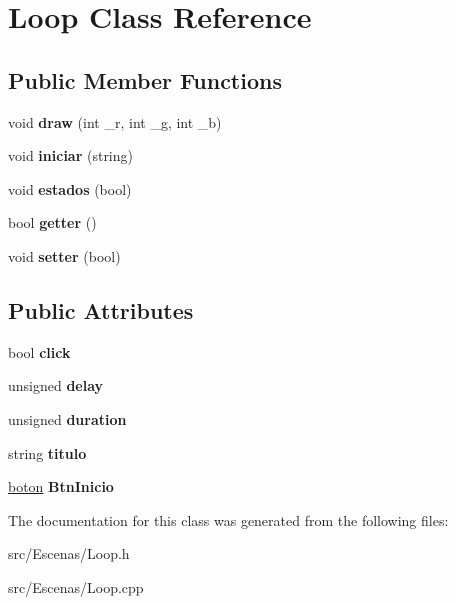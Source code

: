 \hypertarget{class_loop}{}\section{Loop Class Reference}
\label{class_loop}
\subsection*{Public Member Functions}
\begin{DoxyCompactItemize}
\item 
\hypertarget{class_loop_af5a09e01ccb89c4a56ff413307e40f35}{}void {\bfseries draw} (int \+\_\+r, int \+\_\+g, int \+\_\+b)\label{class_loop_af5a09e01ccb89c4a56ff413307e40f35}

\item 
\hypertarget{class_loop_a9306a04aa633128dbb189447f98e7bb6}{}void {\bfseries iniciar} (string)\label{class_loop_a9306a04aa633128dbb189447f98e7bb6}

\item 
\hypertarget{class_loop_a0ff1b1f2b8ecaaacf12f50ca99c78e71}{}void {\bfseries estados} (bool)\label{class_loop_a0ff1b1f2b8ecaaacf12f50ca99c78e71}

\item 
\hypertarget{class_loop_a383a56657f0f66f38574b861acc1e08c}{}bool {\bfseries getter} ()\label{class_loop_a383a56657f0f66f38574b861acc1e08c}

\item 
\hypertarget{class_loop_a743df2606ee2bffbdb023cdf3990811b}{}void {\bfseries setter} (bool)\label{class_loop_a743df2606ee2bffbdb023cdf3990811b}

\end{DoxyCompactItemize}
\subsection*{Public Attributes}
\begin{DoxyCompactItemize}
\item 
\hypertarget{class_loop_a379dc8a5cdafdacd57827551e71d70b3}{}bool {\bfseries click}\label{class_loop_a379dc8a5cdafdacd57827551e71d70b3}

\item 
\hypertarget{class_loop_acd394210e9a806bd24b6b6b9fc9348c0}{}unsigned {\bfseries delay}\label{class_loop_acd394210e9a806bd24b6b6b9fc9348c0}

\item 
\hypertarget{class_loop_ad6e5bad3f0c7b5e82a09703fe2745618}{}unsigned {\bfseries duration}\label{class_loop_ad6e5bad3f0c7b5e82a09703fe2745618}

\item 
\hypertarget{class_loop_adbaa419f759998879ed0661c5f8aa6ba}{}string {\bfseries titulo}\label{class_loop_adbaa419f759998879ed0661c5f8aa6ba}

\item 
\hypertarget{class_loop_a7f8642405f9a1f8df7402d592c455307}{}\hyperlink{classboton}{boton} {\bfseries Btn\+Inicio}\label{class_loop_a7f8642405f9a1f8df7402d592c455307}

\end{DoxyCompactItemize}


The documentation for this class was generated from the following files\+:\begin{DoxyCompactItemize}
\item 
src/\+Escenas/Loop.\+h\item 
src/\+Escenas/Loop.\+cpp\end{DoxyCompactItemize}
